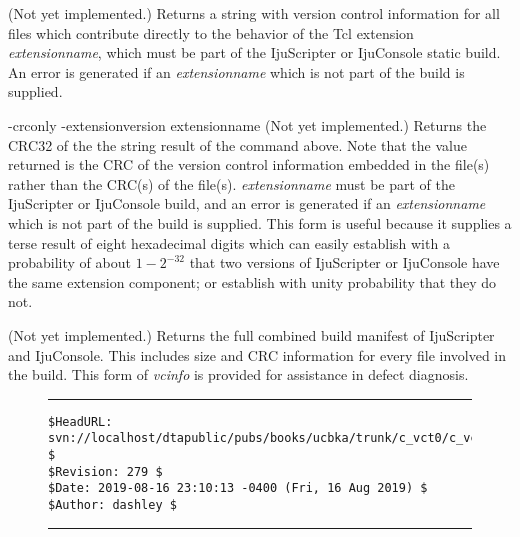 \begin{tclcommanddescription}
\begin{tclcommandinternaldescription}{}
(Not yet implemented.)  Returns a string with version control information for all
files which contribute directly to the behavior of the Tcl extension \emph{extensionname}, 
which must be part of the IjuScripter or IjuConsole static build.
An error is generated if an \emph{extensionname} which is not part of the build
is supplied.
\end{tclcommandinternaldescription}

\begin{tclcommandinternaldescription}{
      {-crconly -extensionversion extensionname}}
(Not yet implemented.)  Returns the CRC32 of the the string result of the command above.  
Note that the value returned is the CRC of the version control information embedded in the file(s)
rather than the CRC(s) of the file(s).
\emph{extensionname} must be part of the IjuScripter or IjuConsole build, and 
an error is generated if an \emph{extensionname} which is not part of the build is supplied.
This form is
useful because it supplies a terse result of eight hexadecimal digits which can easily
establish with a probability of about $1-2^{-32}$ that two versions of IjuScripter or IjuConsole
have the same extension component; or establish with unity probability that they do not.
\end{tclcommandinternaldescription}

\begin{tclcommandinternaldescription}{}
(Not yet implemented.)  Returns the full combined build manifest of IjuScripter and IjuConsole.
This includes size and CRC information for every file involved in the build.  This form
of \emph{vcinfo} is provided for assistance in defect diagnosis.
\end{tclcommandinternaldescription}

\end{tclcommanddescription}

\noindent\begin{figure}[!b]
\noindent\rule[-0.25in]{\textwidth}{1pt}
\begin{tiny}
\begin{verbatim}
$HeadURL: svn://localhost/dtapublic/pubs/books/ucbka/trunk/c_vct0/c_vct0.tex $
$Revision: 279 $
$Date: 2019-08-16 23:10:13 -0400 (Fri, 16 Aug 2019) $
$Author: dashley $
\end{verbatim}
\end{tiny}
\noindent\rule[0.25in]{\textwidth}{1pt}
\end{figure}
%
